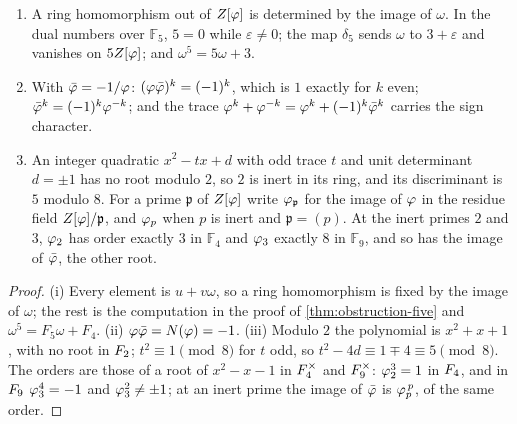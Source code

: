 \begin{proposition}\label{prop:artin-machinery}
\begin{enumerate}[label=\textup{(\roman*)}]
  \item A ring homomorphism out of $Z[\varphi]$ is determined by the image of $\omega$.
    In the dual numbers over $\mathbb F_5$, $5=0$ while $\varepsilon\ne0$; the map
    $\delta_5$ sends $\omega$ to $3+\varepsilon$ and vanishes on $5Z[\varphi]$; and
    $\omega^5=5\omega+3$.
  \item With $\bar{\varphi}=-1/\varphi$: $(\varphi\bar{\varphi})^k=(-1)^k$, which is $1$ exactly
    for $k$ even; $\bar{\varphi}^k=(-1)^k\varphi^{-k}$; and the trace
    $\varphi^k+\varphi^{-k}=\varphi^k+(-1)^k\bar{\varphi}^k$ carries the sign character.
    \item An integer quadratic $x^2-tx+d$ with odd trace $t$ and unit determinant $d=\pm1$ has no root
    modulo $2$, so $2$ is inert in its ring, and its discriminant is $5$ modulo $8$.  For a prime
    $\mathfrak p$ of $Z[\varphi]$ write $\varphi_{\mathfrak p}$ for the image of $\varphi$ in the residue field
    $Z[\varphi]/\mathfrak p$, and $\varphi_p$ when $p$ is inert and $\mathfrak p=(p)$.  At the inert
    primes $2$ and $3$, $\varphi_2$ has order exactly $3$ in $\mathbb F_4$ and $\varphi_3$ exactly $8$ in
    $\mathbb F_9$, and so has the image of $\bar{\varphi}$, the other root.
\end{enumerate}
\end{proposition}
\begin{proof}
(i) Every element is $u+v\omega$, so a ring homomorphism is fixed by the image of $\omega$; the rest
is the computation in the proof of \cref{thm:obstruction-five} and $\omega^5=F_5\omega+F_4$.
(ii) $\varphi\bar{\varphi}=N(\varphi)=-1$.  (iii) Modulo $2$ the polynomial is $x^2+x+1$, with no root
in $F_2$; $t^2\equiv1\pmod8$ for $t$ odd, so $t^2-4d\equiv1\mp4\equiv5\pmod8$.  The orders are those
of a root of $x^2-x-1$ in $F_4^\times$ and $F_9^\times$: $\varphi_2^3=1$ in $F_4$, and in $F_9$
$\varphi_3^{4}=-1$ and $\varphi_3^2\neq\pm1$; at an inert prime the image of $\bar{\varphi}$ is $\varphi_p^{\,p}$, of the
same order.
\end{proof}

